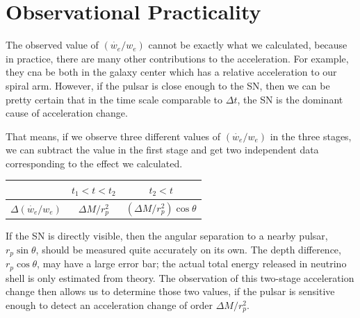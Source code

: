 \documentclass[aps,showpacs,twocolumn,floats,prd,superscriptaddress,nofootinbib]{revtex4-1}
\begin{document}
\section{Observational Practicality}
\label{sec-obs}

The observed value of $(\dot{w_e}/w_e)$ cannot be exactly what we calculated, because in practice, there are many other contributions to the acceleration. For example, they cna be both in the galaxy center which has a relative acceleration to our spiral arm. However, if the pulsar is close enough to the SN, then we can be pretty certain that in the time scale comparable to $\Delta t$, the SN is the dominant cause of acceleration change. %

That means, if we observe three different values of $(\dot{w_e}/w_e)$ in the three stages, we can subtract the value in the first stage and get two independent data corresponding to the effect we calculated.
\begin{center}
\begin{tabular}{| c | c | c |} 
\hline
                & $t_1<t<t_2$ & $t_2<t$ \\ 
       \hline 
$\Delta(\dot{w_e}/w_e)$ & $ \Delta M/r_p^2$ 
& $(\Delta M/r_p^2)\cos\theta$   \\ 
\hline 
\end{tabular}
\end{center}

If the SN is directly visible, then the angular separation to a nearby pulsar, $r_p\sin\theta$, should be measured quite accurately on its own. The depth difference, $r_p\cos\theta$, may have a large error bar; the actual total energy released in neutrino shell is only estimated from theory. The observation of this two-stage acceleration change then allows us to determine those two values, if the pulsar is sensitive enough to detect an acceleration change of order $\Delta M/r_p^2$.
\end{document}
